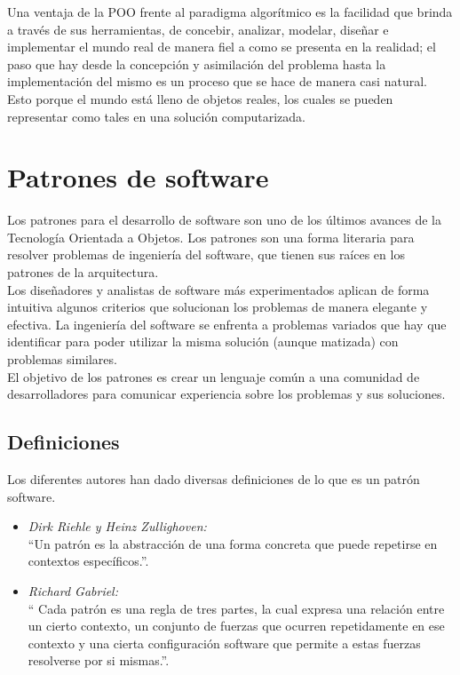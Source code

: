 Una ventaja de la POO frente al paradigma algorítmico es la facilidad que brinda a través de sus herramientas, de concebir, analizar, modelar, diseñar e implementar el mundo real de manera fiel a como se presenta en la realidad; el paso que hay desde la concepción y asimilación del problema hasta la implementación del mismo es un proceso que se hace de manera casi natural. Esto porque el mundo está lleno de objetos reales, los cuales se pueden representar como tales en una solución computarizada.

\section{Patrones de software}
Los patrones para el desarrollo de software son uno de los últimos avances de la Tecnología Orientada a Objetos. Los patrones son una forma literaria para resolver problemas de
ingeniería del software, que tienen sus raíces en los patrones de la arquitectura. \\

Los diseñadores y analistas de software más experimentados aplican de forma intuitiva algunos criterios que solucionan los problemas de manera elegante y efectiva. La ingeniería del
software se enfrenta a problemas variados que hay que identificar para poder utilizar la misma solución (aunque matizada) con problemas similares. \\

El objetivo de los patrones es crear un lenguaje común a una comunidad de desarrolladores para comunicar experiencia sobre los problemas y sus soluciones.

  \subsection{Definiciones}
  Los diferentes autores han dado diversas definiciones de lo que es un patrón software.
  \begin{itemize}
  	\item \textit{Dirk Riehle y Heinz Zullighoven:} \\
  	“Un patrón es la abstracción de una forma concreta que puede repetirse en contextos específicos.”.
 	\item \textit{Richard Gabriel:} \\
  	“  Cada patrón es una regla de tres partes, la cual expresa una relación entre un cierto contexto, un conjunto de fuerzas que ocurren repetidamente en ese contexto y una cierta configuración software que permite a estas fuerzas resolverse por si mismas.”.
  \end{itemize}
  
